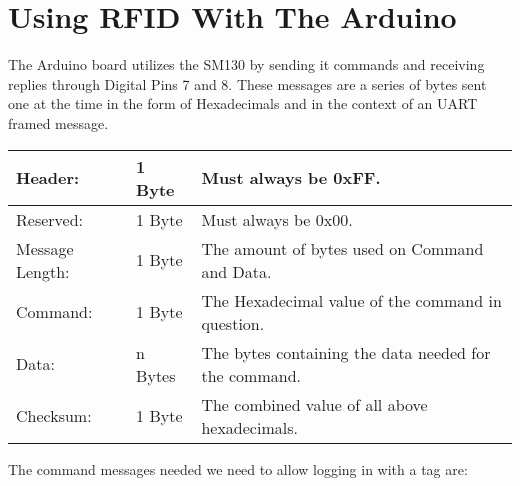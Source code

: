 \section{Using RFID With The Arduino}
The Arduino board utilizes the SM130 by sending it commands and receiving replies through Digital Pins 7 and 8.
These messages are a series of bytes sent one at the time in the form of Hexadecimals and in the context of an UART framed message. \newline
\begin{tabular}{|l|l|l|}
\hline \hline
Header: & 1 Byte & Must always be 0xFF.\\ \hline
Reserved: & 1 Byte & Must always be 0x00.\\ \hline
Message Length: & 1 Byte & The amount of bytes used on Command and Data.\\ \hline
Command: & 1 Byte & The Hexadecimal value of the command in question.\\ \hline
Data: & n Bytes & The bytes containing the data needed for the command.\\ \hline
Checksum: & 1 Byte & The combined value of all above hexadecimals.\\ \hline
\end{tabular}
The command messages needed we need to allow logging in with a tag are: 
